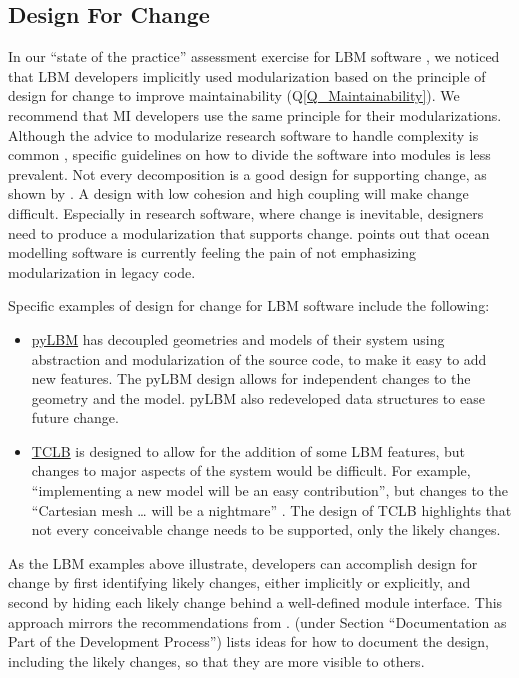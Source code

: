 \documentclass[final, 3p, times, authoryear]{elsarticle}
\newcommand{\qref}[1]{Q\ref{#1}}
\begin{document}
\subsection{Design For Change} \label{Sec_DesForChange}

In our ``state of the practice'' assessment exercise for LBM software
\citep{SmithEtAl2022}, we noticed that LBM developers implicitly used
modularization based on the principle of design for change to improve
maintainability (\qref{Q_Maintainability}).  We recommend that MI developers use
the same principle for their modularizations.  Although the advice to modularize
research software to handle complexity is common \citep{WilsonEtAl2014,
StewartEtAl2017, Storer2017}, specific guidelines on how to divide the software
into modules is less prevalent.  Not every decomposition is a good design for
supporting change, as shown by \citet{Parnas1972a}.  A design with low cohesion
and high coupling \citep[p.\ 48]{GhezziEtAl2003} will make change difficult.
Especially in research software, where change is inevitable, designers need to
produce a modularization that supports change. \citep{JungEtAl2022} points out
that ocean modelling software is currently feeling the pain of not emphasizing
modularization in legacy code.

Specific examples of design for change for LBM software \citep{SmithEtAl2022}
include the following:

\begin{itemize}
\item \href{https://github.com/pylbm/pylbm}{pyLBM} has decoupled geometries and
models of their system using abstraction and modularization of the source code,
to make it easy to add new features.  The pyLBM design allows for independent
changes to the geometry and the model.  pyLBM also redeveloped data structures
to ease future change. 
\item \href{https://github.com/CFD-GO/TCLB}{TCLB} \citep{rokicki2016adjoint} is
designed to allow for the addition of some LBM features, but changes to major
aspects of the system would be difficult. For example, ``implementing a new
model will be an easy contribution'', but changes to the ``Cartesian mesh … will
be a nightmare'' \citep{SmithEtAl2022}. The design of TCLB highlights that not
every conceivable change needs to be supported, only the likely changes.  
\end{itemize}

As the LBM examples above illustrate, developers can accomplish design for
change by first identifying likely changes, either implicitly or explicitly, and
second by hiding each likely change behind a well-defined module interface.
This approach mirrors the recommendations from \citet{Parnas1972a}.
\citet{SmithEtAl2022} (under Section ``Documentation as Part of the Development
Process'') lists ideas for how to document the design, including the likely
changes, so that they are more visible to others.
\end{document}
